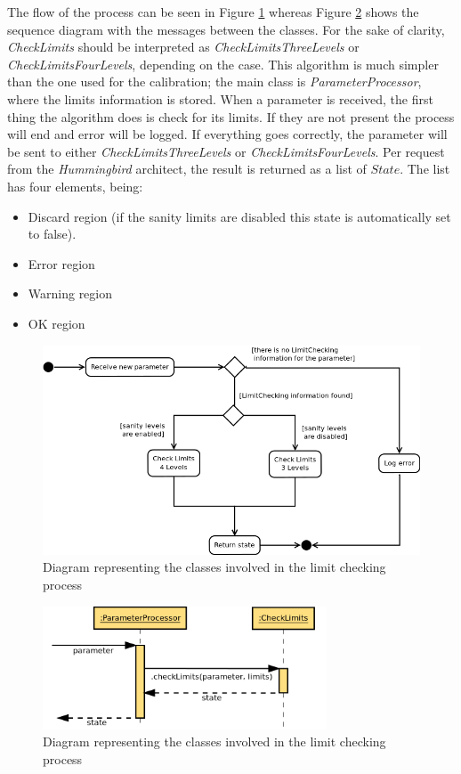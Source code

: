 The flow of the process can be seen in Figure \ref{f5.11} whereas Figure \ref{f5.12} shows the sequence diagram with the messages between the classes. For the sake of clarity, \emph{CheckLimits} should be interpreted as \emph{CheckLimitsThreeLevels} or \emph{CheckLimitsFourLevels}, depending on the case. This algorithm is much simpler than the one used for the calibration; the main class is \emph{ParameterProcessor}, where the limits information is stored. When a parameter is received, the first thing the algorithm does is check for its limits. If they are not present the process will end and error will be logged. If everything goes correctly, the parameter will be sent to either \emph{CheckLimitsThreeLevels} or \emph{CheckLimitsFourLevels}.
\newpage
Per request from the \emph{Hummingbird} architect, the result is returned as a list of $State$. The list has four elements, being:
\begin{itemize}
\item Discard region (if the sanity limits are disabled this state is automatically set to false).
\item Error region
\item Warning region
\item OK region
\end{itemize}

\begin{figure}[H]
\centerline{\includegraphics[width=1\textwidth]{images/LimitCheckingFlowChart.png}}
\caption{Diagram representing the classes involved in the limit checking process}
\label{f5.11}
\end{figure}


\begin{figure}[H]
\centerline{\includegraphics[width=0.75\textwidth]{images/CheckLimitsSequence.png}}
\caption{Diagram representing the classes involved in the limit checking process}
\label{f5.12}
\end{figure}
\newpage

